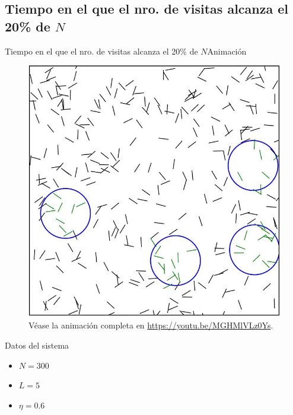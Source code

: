 \documentclass{beamer}
\begin{document}
        \subsection{Tiempo en el que el nro. de visitas alcanza el 20\% de $N$}

            \begin{frame}{Tiempo en el que el nro. de visitas alcanza el 20\% de $N$}{Animación}
                \begin{minipage}[t]{0.60\textwidth}
                    \begin{figure}[H!]
                        \includegraphics[height=.65\textheight]{animation_visits_pbc-n300-eta0p6-frame}
                        \caption*{Véase la animación completa en \url{https://youtu.be/MGHMlVLz0Ys}.}
                        \label{fig:pbc_1}
                    \end{figure}
                \end{minipage}
                \hfill
                \begin{minipage}[t]{0.30\textwidth}
                    \begin{block}{Datos del sistema}
                        \begin{itemize}
                            \item $N=300$
                            \item $L=5$
                            \item $\eta=0.6$
                        \end{itemize}
                    \end{block}
                \end{minipage}
            \end{frame}
\end{document}
